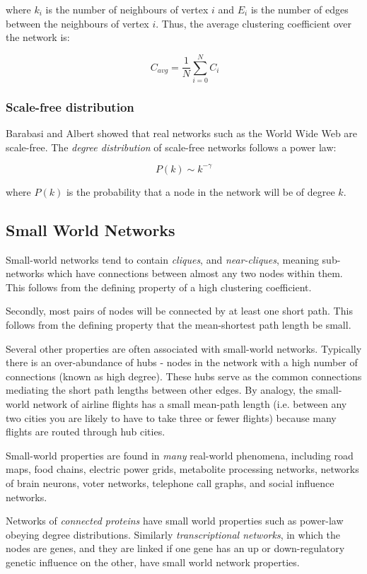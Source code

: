 \documentclass[a4paper,11pt,titlepage]{article}
\begin{document}
where $k_i$ is the number of neighbours of vertex $i$ and $E_i$ is the number
of edges between the neighbours of vertex $i$. Thus, the average clustering
coefficient over the network is:

\[ \ C_{avg} = \frac{1}{N}\sum_{i=0}^{N} C_i \]

\subsubsection{Scale-free distribution}
\label{sec:scale-free}

Barabasi and Albert showed that real networks such as the World Wide Web are
scale-free. The \emph{degree distribution} of scale-free networks follows a
power law:

\[ P(k) \sim k^{-\gamma} \]

where $P(k)$ is the probability that a node in the network will be of degree $k$.

\subsection{Small World Networks}

Small-world networks tend to contain \emph{cliques}, and \emph{near-cliques}, meaning sub-networks which have connections between almost any two nodes within them. This follows from the defining property of a high clustering coefficient. 

Secondly, most pairs of nodes will be connected by at least one short path. This follows from the defining property that the mean-shortest path length be small.

Several other properties are often associated with small-world networks. Typically there is an over-abundance of hubs - nodes in the network with a high number of connections (known as high degree). These hubs serve as the common connections mediating the short path lengths between other edges. By analogy, the small-world network of airline flights has a small mean-path length (i.e. between any two cities you are likely to have to take three or fewer flights) because many flights are routed through hub cities. \cite{smnet}

Small-world properties are found in \emph{many} real-world phenomena, including road maps, food chains, electric power grids, metabolite processing networks, networks of brain neurons, voter networks, telephone call graphs, and social influence networks.

Networks of \emph{connected proteins} have small world properties such as power-law obeying degree distributions. Similarly \emph{transcriptional networks}, in which the nodes are genes, and they are linked if one gene has an up or down-regulatory genetic influence on the other, have small world network properties.
\end{document}
